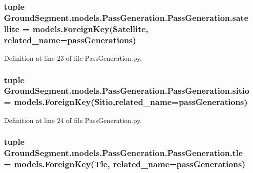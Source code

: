 \subsubsection[{satellite}]{\setlength{\rightskip}{0pt plus 5cm}tuple Ground\+Segment.\+models.\+Pass\+Generation.\+Pass\+Generation.\+satellite = models.\+Foreign\+Key({\bf Satellite}, related\+\_\+name=\textquotesingle{}pass\+Generations\textquotesingle{})\hspace{0.3cm}{\ttfamily [static]}}\label{class_ground_segment_1_1models_1_1_pass_generation_1_1_pass_generation_a0f1c573d07a1127b70c0e4b3085e0149}


Definition at line 23 of file Pass\+Generation.\+py.

\hypertarget{class_ground_segment_1_1models_1_1_pass_generation_1_1_pass_generation_a3917c0e67d8a74db52404c6696d2e1c8}{}
\subsubsection[{sitio}]{\setlength{\rightskip}{0pt plus 5cm}tuple Ground\+Segment.\+models.\+Pass\+Generation.\+Pass\+Generation.\+sitio = models.\+Foreign\+Key({\bf Sitio},related\+\_\+name=\textquotesingle{}pass\+Generations\textquotesingle{})\hspace{0.3cm}{\ttfamily [static]}}\label{class_ground_segment_1_1models_1_1_pass_generation_1_1_pass_generation_a3917c0e67d8a74db52404c6696d2e1c8}


Definition at line 24 of file Pass\+Generation.\+py.

\hypertarget{class_ground_segment_1_1models_1_1_pass_generation_1_1_pass_generation_a71db0ead15e88702108257298c413ffe}{}
\subsubsection[{tle}]{\setlength{\rightskip}{0pt plus 5cm}tuple Ground\+Segment.\+models.\+Pass\+Generation.\+Pass\+Generation.\+tle = models.\+Foreign\+Key({\bf Tle}, related\+\_\+name=\textquotesingle{}pass\+Generations\textquotesingle{})\hspace{0.3cm}{\ttfamily [static]}}\label{class_ground_segment_1_1models_1_1_pass_generation_1_1_pass_generation_a71db0ead15e88702108257298c413ffe}


